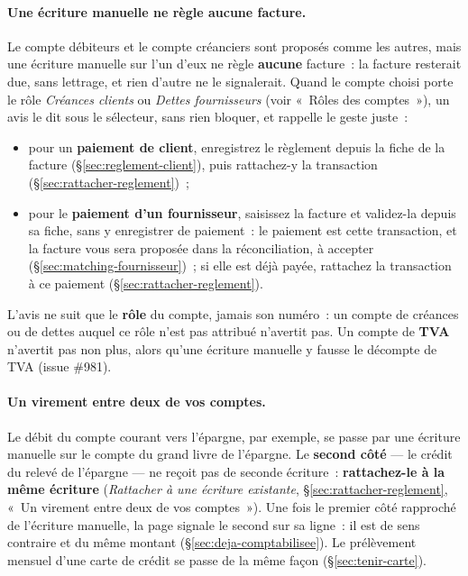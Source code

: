 \documentclass[a4paper,11pt,oneside]{article}
\begin{document}
\paragraph{Une écriture manuelle ne règle aucune facture.} Le compte débiteurs et le compte créanciers sont proposés comme les autres, mais une écriture manuelle sur l'un d'eux ne règle \textbf{aucune} facture~: la facture resterait due, sans lettrage, et rien d'autre ne le signalerait. Quand le compte choisi porte le rôle \emph{Créances clients} ou \emph{Dettes fournisseurs} (voir «~Rôles des comptes~»), un avis le dit sous le sélecteur, sans rien bloquer, et rappelle le geste juste~:
\begin{itemize}
    \item pour un \textbf{paiement de client}, enregistrez le règlement depuis la fiche de la facture (\S\ref{sec:reglement-client}), puis rattachez-y la transaction (\S\ref{sec:rattacher-reglement})~;
    \item pour le \textbf{paiement d'un fournisseur}, saisissez la facture et validez-la depuis sa fiche, sans y enregistrer de paiement~: le paiement est cette transaction, et la facture vous sera proposée dans la réconciliation, à accepter (\S\ref{sec:matching-fournisseur})~; si elle est déjà payée, rattachez la transaction à ce paiement (\S\ref{sec:rattacher-reglement}).
\end{itemize}
L'avis ne suit que le \textbf{rôle} du compte, jamais son numéro~: un compte de créances ou de dettes auquel ce rôle n'est pas attribué n'avertit pas. Un compte de \textbf{TVA} n'avertit pas non plus, alors qu'une écriture manuelle y fausse le décompte de TVA (issue \#981).

\paragraph{Un virement entre deux de vos comptes.} Le débit du compte courant vers l'épargne, par exemple, se passe par une écriture manuelle sur le compte du grand livre de l'épargne. Le \textbf{second côté} --- le crédit du relevé de l'épargne --- ne reçoit pas de seconde écriture~: \textbf{rattachez-le à la même écriture} (\emph{Rattacher à une écriture existante}, \S\ref{sec:rattacher-reglement}, «~Un virement entre deux de vos comptes~»). Une fois le premier côté rapproché de l'écriture manuelle, la page signale le second sur sa ligne~: il est de sens contraire et du même montant (\S\ref{sec:deja-comptabilisee}). Le prélèvement mensuel d'une carte de crédit se passe de la même façon (\S\ref{sec:tenir-carte}).
\end{document}
